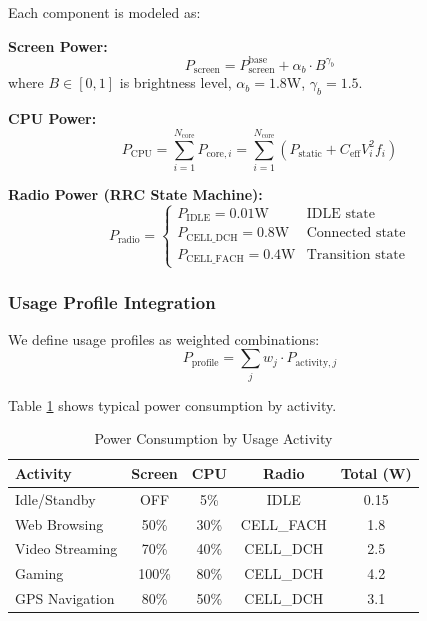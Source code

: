 Each component is modeled as:

\textbf{Screen Power:}
\begin{equation}
P_{\text{screen}} = P_{\text{screen}}^{\text{base}} + \alpha_b \cdot B^{\gamma_b}
\end{equation}
where $B \in [0,1]$ is brightness level, $\alpha_b = 1.8$W, $\gamma_b = 1.5$.

\textbf{CPU Power:}
\begin{equation}
P_{\text{CPU}} = \sum_{i=1}^{N_{\text{core}}} P_{\text{core},i} = \sum_{i=1}^{N_{\text{core}}} \left(P_{\text{static}} + C_{\text{eff}} V_i^2 f_i\right)
\label{eq:cpu_power}
\end{equation}

\textbf{Radio Power (RRC State Machine):}
\begin{equation}
P_{\text{radio}} = \begin{cases}
P_{\text{IDLE}} = 0.01\text{W} & \text{IDLE state} \\
P_{\text{CELL\_DCH}} = 0.8\text{W} & \text{Connected state} \\
P_{\text{CELL\_FACH}} = 0.4\text{W} & \text{Transition state}
\end{cases}
\end{equation}

\subsubsection{Usage Profile Integration}

We define usage profiles as weighted combinations:
\begin{equation}
P_{\text{profile}} = \sum_{j} w_j \cdot P_{\text{activity},j}
\end{equation}

Table \ref{tab:profiles} shows typical power consumption by activity.

\begin{table}[H]
\centering
\caption{Power Consumption by Usage Activity}
\label{tab:profiles}
\begin{tabular}{lcccc}
\toprule
\textbf{Activity} & \textbf{Screen} & \textbf{CPU} & \textbf{Radio} & \textbf{Total (W)} \\
\midrule
Idle/Standby & OFF & 5\% & IDLE & 0.15 \\
Web Browsing & 50\% & 30\% & CELL\_FACH & 1.8 \\
Video Streaming & 70\% & 40\% & CELL\_DCH & 2.5 \\
Gaming & 100\% & 80\% & CELL\_DCH & 4.2 \\
GPS Navigation & 80\% & 50\% & CELL\_DCH & 3.1 \\
\bottomrule
\end{tabular}
\end{table}


